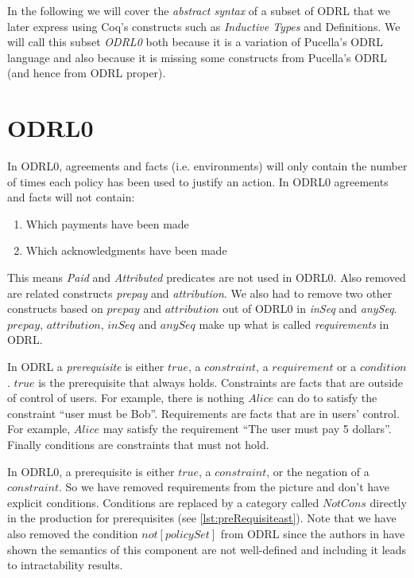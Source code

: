 In the following we will cover the \emph{abstract syntax} of a subset of ODRL that we later express using Coq's constructs such as \emph{Inductive Types} and Definitions. We will call this subset \emph{ODRL0} both because it is a variation of Pucella's ODRL language and also because it is missing some constructs from Pucella's ODRL (and hence from ODRL proper). 

\section{ODRL0}\label{sec:odrl0}
In ODRL0, agreements and facts (i.e. environments) will only contain the number of times each policy has been used to justify an action. In ODRL0 agreements and facts will not contain: \begin{enumerate}
  \item Which payments have been made
  \item Which acknowledgments have been made
\end{enumerate} 

This means \emph{Paid} and \emph{Attributed} predicates are not used in ODRL0. Also removed are related constructs \emph{prepay} and \emph{attribution}. We also had to remove two other constructs based on $prepay$ and $attribution$ out of ODRL0 in \emph{inSeq} and \emph{anySeq}. $prepay$, $attribution$, $inSeq$ and $anySeq$ make up what is called \emph{requirements} in ODRL.

In ODRL a \emph{prerequisite} is either $true$, a $constraint$, a $requirement$ or a $condition$. $true$ is the prerequisite that always holds. Constraints are facts that are outside of control of users. For example, there is nothing $Alice$ can do to satisfy the constraint ``user must be Bob''. Requirements are facts that are in users' control. For example, $Alice$ may satisfy the requirement ``The user must pay 5 dollars''. Finally conditions are constraints that must not hold.

In ODRL0, a prerequisite is either $true$, a $constraint$, or the negation of a $constraint$. So we have removed requirements from the picture and don't have explicit conditions. Conditions are replaced by a category called $NotCons$ directly in the production for prerequisites (see \ref{lst:preRequisiteast}). Note that we have also removed the condition $not[policySet]$ from ODRL since the authors in \cite{pucella2006} have shown the semantics of this component are not well-defined and including it leads to intractability results.

